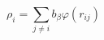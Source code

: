\documentclass[12pt]{article}
\begin{document}
$$
\rho_i = \sum_{j \neq i} b_\beta \varphi(r_{ij})
$$
\end{document}
